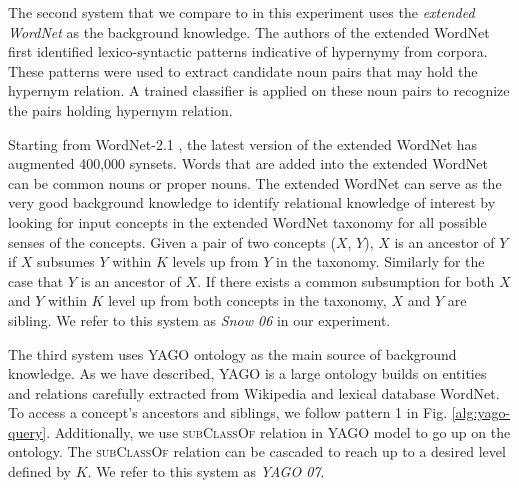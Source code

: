 The second system that we compare to in this experiment uses the {\em
  extended WordNet} \cite{ilprints665,Snow2006} as the background
knowledge. The authors of the extended WordNet \cite{ilprints665}
first identified lexico-syntactic patterns indicative of hypernymy
from corpora. These patterns were used to extract candidate noun pairs
that may hold the hypernym relation. A trained classifier is applied
on these noun pairs to recognize the pairs holding hypernym relation.
  Starting from
WordNet-2.1 \cite{Fellbaum98}, the latest version of the extended
WordNet has augmented 400,000 synsets. Words that are added into the
extended WordNet can be common nouns or proper nouns. The extended
WordNet can serve as the very good background knowledge to identify
relational knowledge of interest by looking for input concepts in the
extended WordNet taxonomy for all possible senses of the
concepts. Given a pair of two concepts ($X$, $Y$), $X$ is an ancestor
of $Y$ if $X$ subsumes $Y$ within $K$ levels up from $Y$ in the
taxonomy. Similarly for the case that $Y$ is an ancestor of $X$. If
there exists a common subsumption for both $X$ and $Y$ within $K$
level up from both concepts in the taxonomy, $X$ and $Y$ are
sibling. We refer to this system as {\em Snow 06} in our experiment.

The third system uses YAGO ontology as the main source of background
knowledge. As we have described, YAGO is a large ontology builds on
entities and relations carefully extracted from Wikipedia and lexical
database WordNet. To access a concept's ancestors and siblings, we
follow pattern 1 in Fig. \ref{alg:yago-query}. Additionally, we use
\textsc{subClassOf} relation in YAGO model to go up on the
ontology. The \textsc{subClassOf} relation can be cascaded to reach up
to a desired level defined by $K$. We refer to this system as {\em
  YAGO 07}.


